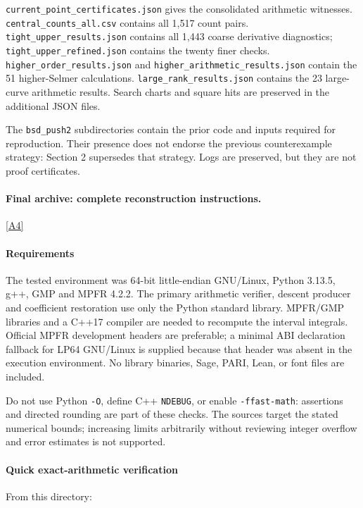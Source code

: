 \documentclass[11pt]{article}
\newcommand{\srcref}[1]{\hyperlink{source:#1}{[#1]}}
\begin{document}
\nolinkurl{current_point_certificates.json} gives the consolidated arithmetic witnesses. \nolinkurl{central_counts_all.csv} contains all 1,517 count pairs. \nolinkurl{tight_upper_results.json} contains all 1,443 coarse derivative diagnostics; \nolinkurl{tight_upper_refined.json} contains the twenty finer checks. \nolinkurl{higher_order_results.json} and \nolinkurl{higher_arithmetic_results.json} contain the 51 higher-Selmer calculations. \nolinkurl{large_rank_results.json} contains the 23 large-curve arithmetic results. Search charts and square hits are preserved in the additional JSON files.

The \nolinkurl{bsd_push2} subdirectories contain the prior code and inputs required for reproduction. Their presence does not endorse the previous counterexample strategy: Section 2 supersedes that strategy. Logs are preserved, but they are not proof certificates.
\paragraph{Final archive: complete reconstruction instructions.}\srcref{A4}
\paragraph{Requirements}

The tested environment was 64-bit little-endian GNU/Linux, Python 3.13.5, g++, GMP and MPFR 4.2.2. The primary arithmetic verifier, descent producer and coefficient restoration use only the Python standard library. MPFR/GMP libraries and a C++17 compiler are needed to recompute the interval integrals. Official MPFR development headers are preferable; a minimal ABI declaration fallback for LP64 GNU/Linux is supplied because that header was absent in the execution environment. No library binaries, Sage, PARI, Lean, or font files are included.

Do not use Python \nolinkurl{-O}, define C++ \nolinkurl{NDEBUG}, or enable \nolinkurl{-ffast-math}: assertions and directed rounding are part of these checks. The sources target the stated numerical bounds; increasing limits arbitrarily without reviewing integer overflow and error estimates is not supported.

\paragraph{Quick exact-arithmetic verification}

From this directory:
\end{document}
